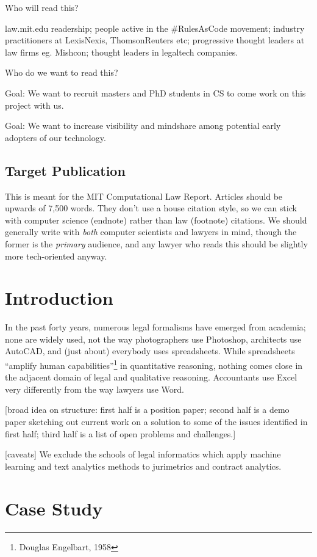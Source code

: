 \documentclass{IOS-Book-Article}
\begin{document}
Who will read this?

law.mit.edu readership; people active in the #RulesAsCode movement; industry practitioners at LexisNexis, ThomsonReuters etc; progressive thought leaders at law firms eg. Mishcon; thought leaders in legaltech companies.

Who do we want to read this?

Goal: We want to recruit masters and PhD students in CS to come work on this project with us.

Goal: We want to increase visibility and mindshare among potential early adopters of our technology.

\subsection{Target Publication}

This is meant for the MIT Computational Law Report. Articles should be upwards of 7,500 words. They don't use a house citation style, so we can stick with computer science (endnote) rather than law (footnote) citations. We should generally write with \textit{both} computer scientists and lawyers in mind, though the former is the \textit{primary} audience, and any lawyer who reads this should be slightly more tech-oriented anyway.

\section{Introduction}

In the past forty years, numerous legal formalisms have emerged from academia; none are widely used, not the way photographers use Photoshop, architects use AutoCAD, and (just about) everybody uses spreadsheets. While spreadsheets ``amplify human capabilities''\footnote{Douglas Engelbart, 1958} in quantitative reasoning, nothing comes close in the adjacent domain of legal and qualitative reasoning. Accountants use Excel very differently from the way lawyers use Word.

[broad idea on structure: first half is a position paper; second half is a demo paper sketching out current work on a solution to some of the issues identified in first half; third half is a list of open problems and challenges.]

[caveats] We exclude the schools of legal informatics which apply machine learning and text analytics methods to jurimetrics and contract analytics.

\section{Case Study}
\end{document}
